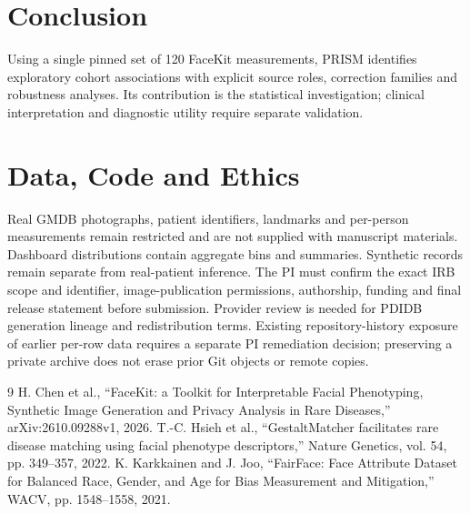 \documentclass[11pt]{article}
\begin{document}
\section{Conclusion}
Using a single pinned set of 120 FaceKit measurements, PRISM identifies exploratory cohort associations with explicit source roles, correction families and robustness analyses. Its contribution is the statistical investigation; clinical interpretation and diagnostic utility require separate validation.
\section{Data, Code and Ethics}
Real GMDB photographs, patient identifiers, landmarks and per-person measurements remain restricted and are not supplied with manuscript materials. Dashboard distributions contain aggregate bins and summaries. Synthetic records remain separate from real-patient inference. The PI must confirm the exact IRB scope and identifier, image-publication permissions, authorship, funding and final release statement before submission. Provider review is needed for PDIDB generation lineage and redistribution terms. Existing repository-history exposure of earlier per-row data requires a separate PI remediation decision; preserving a private archive does not erase prior Git objects or remote copies.
\begin{thebibliography}{9}
 H. Chen et al., ``FaceKit: a Toolkit for Interpretable Facial Phenotyping, Synthetic Image Generation and Privacy Analysis in Rare Diseases,'' arXiv:2610.09288v1, 2026.
 T.-C. Hsieh et al., ``GestaltMatcher facilitates rare disease matching using facial phenotype descriptors,'' Nature Genetics, vol. 54, pp. 349--357, 2022.
 K. Karkkainen and J. Joo, ``FairFace: Face Attribute Dataset for Balanced Race, Gender, and Age for Bias Measurement and Mitigation,'' WACV, pp. 1548--1558, 2021.
\end{thebibliography}
\end{document}
